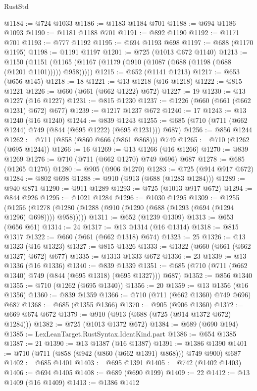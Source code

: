 \begin{lexlean}{RustStd}
\begin{coremodule}
{\begin{coremodule}
{{{{{{{{{{{{{{{{{{{{@1184 := @724 @1033
@1186 := @1183 @1184 @701
@1188 := @694 @1186 @1093
@1190 := @1181 @1188 @701
@1191 := @892 @1190
@1192 := @1171 @701
@1193 := @777 @1192
@1195 := @694 @1193 @698
@1197 := @688 (@1170 @1195)
@1198 := @1191 @1197
@1201 := @725 (@1013 @672 @1140)
@1213 := @1150
    (@1151 (@1165 (@1167 (@1179 (@910 (@1087 (@688 (@1198 (@688 (@1201 @1101))))) @958)))))
@1215 := @652 (@1141 @1213)
@1217 := @653 (@656 @145)
@1218 := 18
@1221 := @13 @1218 (@16 @1218)
@1222 := @815 @1221
@1226 := @660 (@661 (@662 @1222) @672)
@1227 := 19
@1230 := @13 @1227 (@16 @1227)
@1231 := @815 @1230
@1237 := @1226 (@660 (@661 (@662 @1231) @672) @677)
@1239 := @1217 @1237 @672
@1240 := 17
@1243 := @13 @1240 (@16 @1240)
@1244 := @839 @1243
@1255 := @685 (@710 (@711 (@662 @1244) @749 (@844 (@695 @1222) (@695 @1231))) @687)
@1256 := @856 @1244
@1262 := @711 (@858 (@860 @666 (@861 @868))) @749
@1265 := @710 (@1262 (@695 @1244))
@1266 := 16
@1269 := @13 @1266 (@16 @1266)
@1270 := @839 @1269
@1276 := @710 (@711 (@662 @1270) @749 @696) @687
@1278 := @685 (@1265 @1276)
@1280 := @905 (@906 @1270)
@1283 := @725 (@914 @917 @672)
@1284 := @802 @698
@1288 := @910 (@913 (@688 (@1283 @1284)))
@1289 := @940 @871
@1290 := @911 @1289
@1293 := @725 (@1013 @917 @672)
@1294 := @844 @926
@1295 := @1021 @1284
@1296 := @1030 @1295
@1309 := @1255
    (@1256 (@1278 (@1280 (@1288 (@910 (@1290 (@688 (@1293 (@694 (@1294 @1296) @698)))) @958)))))
@1311 := @652 (@1239 @1309)
@1313 := @653 (@656 @61)
@1314 := 24
@1317 := @13 @1314 (@16 @1314)
@1318 := @815 @1317
@1322 := @660 (@661 (@662 @1318) @674)
@1323 := 25
@1326 := @13 @1323 (@16 @1323)
@1327 := @815 @1326
@1333 := @1322 (@660 (@661 (@662 @1327) @672) @677)
@1335 := @1313 @1333 @672
@1336 := 23
@1339 := @13 @1336 (@16 @1336)
@1340 := @839 @1339
@1351 := @685 (@710 (@711 (@662 @1340) @749 (@844 (@695 @1318) (@695 @1327))) @687)
@1352 := @856 @1340
@1355 := @710 (@1262 (@695 @1340))
@1356 := 20
@1359 := @13 @1356 (@16 @1356)
@1360 := @839 @1359
@1366 := @710 (@711 (@662 @1360) @749 @696) @687
@1368 := @685 (@1355 @1366)
@1370 := @905 (@906 @1360)
@1372 := @669 @674 @672
@1379 := @910 (@913 (@688 (@725 (@914 @1372 @672) @1284)))
@1382 := @725 (@1013 @1372 @672)
@1384 := @689 (@690 @194)
@1385 := LexLeanTarget.RustSyntax.IdentKind.part
@1386 := @654 @1385
@1387 := 21
@1390 := @13 @1387 (@16 @1387)
@1391 := @1386 @1390
@1401 := @710 (@711 (@858 (@942 (@860 (@662 @1391) @868))) @749 @900) @687
@1402 := @685 @1401
@1403 := @695 @1391
@1405 := @742 (@1402 @1403)
@1406 := @694 @1405
@1408 := @689 (@690 @199)
@1409 := 22
@1412 := @13 @1409 (@16 @1409)
@1413 := @1386 @1412
}}}}}}}}}}}}}}}}}}}}
\end{coremodule}}
\end{coremodule}
\end{lexlean}
